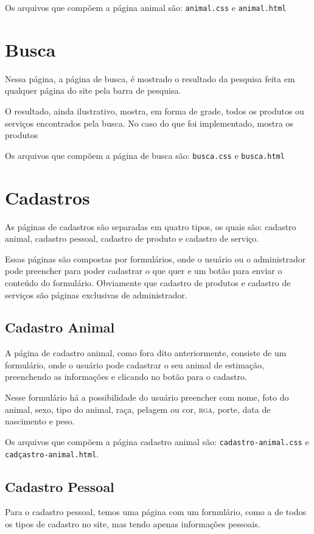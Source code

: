Os arquivos que compõem a página animal são: \texttt{animal.css} e \texttt{animal.html}

\section{Busca}
Nessa página, a página de busca, é mostrado o resultado da pesquisa feita em qualquer página
do site pela barra de pesquisa.

O resultado, ainda ilustrativo, mostra, em forma de grade, todos os produtos ou serviços
encontrados pela busca. No caso do que foi implementado, mostra os produtos

Os arquivos que compõem a página de busca são: \texttt{busca.css} e \texttt{busca.html}

\section{Cadastros}
As páginas de cadastros são separadas em quatro tipos, os quais são: cadastro animal,
cadastro pessoal, cadastro de produto e cadastro de serviço.

Essas páginas são compostas por formulários, onde o usuário ou o administrador pode preencher
para poder cadastrar o que quer e um botão para enviar o conteúdo do formulário. Obviamente
que cadastro de produtos e cadastro de serviços são páginas exclusivas de administrador.

\subsection{Cadastro Animal}
A página de cadastro animal, como fora dito anteriormente, consiste de um formulário,
onde o usuário pode cadastrar o seu animal de estimação, preenchendo as informações e
clicando no botão para o cadastro.

Nesse formulário há a possibilidade do usuário preencher com nome, foto do animal, sexo,
tipo do animal, raça, pelagem ou cor, \textsc{rga}, porte, data de nascimento e peso.

Os arquivos que compõem a página cadastro animal são: \texttt{cadastro-animal.css} e
\texttt{cadçastro-animal.html}.

\subsection{Cadastro Pessoal}
Para o cadastro pessoal, temos uma página com um formulário, como a de todos os tipos
de cadastro no site, mas tendo apenas informações pessoais.

